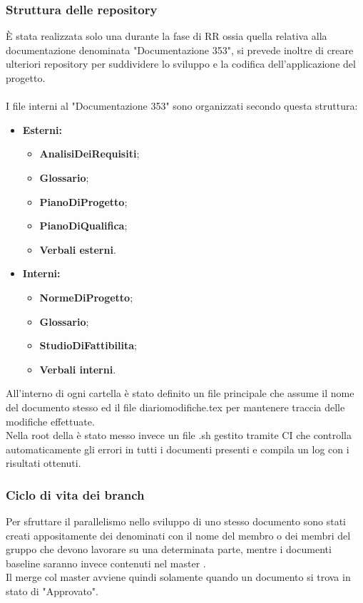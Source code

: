 \documentclass[NormeDiProgetto.tex]{subfiles}
\begin{document}
	\subsubsection{Struttura delle repository}
	\`{E} stata realizzata solo una  durante la fase di RR ossia quella relativa alla documentazione denominata "Documentazione 353", si prevede inoltre di creare ulteriori repository per suddividere lo sviluppo e la codifica dell'applicazione del progetto. \\\\
	I file interni al  "Documentazione 353" sono organizzati secondo questa struttura:
	\begin{itemize}
		\item \textbf{Esterni:}
				\begin{itemize}
				\item \textbf{AnalisiDeiRequisiti};
				\item \textbf{Glossario};
				\item \textbf{PianoDiProgetto};
				\item \textbf{PianoDiQualifica};
				\item \textbf{Verbali esterni}.
			\end{itemize}
		\item \textbf{Interni:}
				\begin{itemize}
					\item \textbf{NormeDiProgetto};
					\item \textbf{Glossario};
					\item \textbf{StudioDiFattibilita};
					\item \textbf{Verbali interni}.
				\end{itemize}		
	\end{itemize}	
	All'interno di ogni cartella è stato definito un file  principale che assume il nome del documento stesso ed il file diariomodifiche.tex per mantenere traccia delle modifiche effettuate.\\
	Nella root della  è stato messo invece un file .sh gestito tramite  CI che controlla automaticamente gli errori in tutti i documenti presenti e compila un log con i risultati ottenuti.
	
	\subsubsection{Ciclo di vita dei branch}
	Per sfruttare il parallelismo nello sviluppo di uno stesso documento sono stati creati appositamente dei  denominati con il nome del membro o dei membri del gruppo che devono lavorare su una determinata parte, mentre i documenti baseline saranno invece contenuti nel master .\\
	Il merge col master avviene quindi solamente quando un documento si trova in stato di "Approvato".
	
\end{document}
